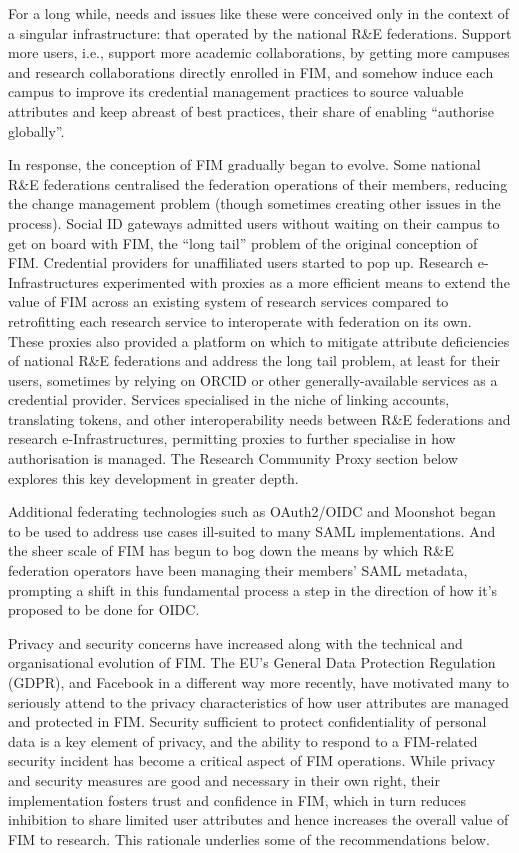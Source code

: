 \documentclass[fleqn,10pt]{wlscirep}
\begin{document}
{For a long while, needs and issues like these were conceived only in the context of a singular infrastructure: that operated by the national R\&E federations. Support more users, i.e., support more academic collaborations, by getting more campuses and research collaborations directly enrolled in FIM, and somehow induce each campus to improve its credential management practices to source valuable attributes and keep abreast of best practices, their share of enabling “authorise globally”. 

In response, the conception of FIM gradually began to evolve. Some national R\&E federations centralised the federation operations of their members, reducing the change management problem (though sometimes creating other issues in the process). Social ID gateways admitted users without waiting on their campus to get on board with FIM, the “long tail” problem of the original conception of FIM. Credential providers for unaffiliated users started to pop up. Research e-Infrastructures experimented with proxies as a more efficient means to extend the value of FIM across an existing system of research services compared to retrofitting each research service to interoperate with federation on its own. These proxies also provided a platform on which to mitigate attribute deficiencies of national R\&E federations and address the long tail problem, at least for their users, sometimes by relying on ORCID\cite{orcid} or other generally-available services as a credential provider. Services specialised in the niche of linking accounts, translating tokens, and other interoperability needs between R\&E federations and research e-Infrastructures, permitting proxies to further specialise in how authorisation is managed. The Research Community Proxy section below explores this key development in greater depth.

Additional federating technologies such as OAuth2/OIDC\cite{oidc} and Moonshot\cite{moonshot} began to be used to address use cases ill-suited to many SAML implementations. And the sheer scale of FIM has begun to bog down the means by which R\&E federation operators have been managing their members’ SAML metadata, prompting a shift in this fundamental process a step in the direction of how it’s proposed to be done for OIDC\cite{oidcfed}. 

Privacy and security concerns have increased along with the technical and organisational evolution of FIM. The EU’s General Data Protection Regulation (GDPR)\cite{GDPR:2016}\cite{eugdpr}, and Facebook in a different way more recently, have motivated many to seriously attend to the privacy characteristics of how user attributes are managed and protected in FIM\cite{assessdp}\cite{attributerelease}\cite{baseline}\cite{dpcoco}. Security sufficient to protect confidentiality of personal data is a key element of privacy, and the ability to respond to a FIM-related security incident has become a critical aspect of FIM operations\cite{sirtfi}. While privacy and security measures are good and necessary in their own right, their implementation fosters trust and confidence in FIM, which in turn reduces inhibition to share limited user attributes and hence increases the overall value of FIM to research. This rationale underlies some of the recommendations below.

}
\end{document}
